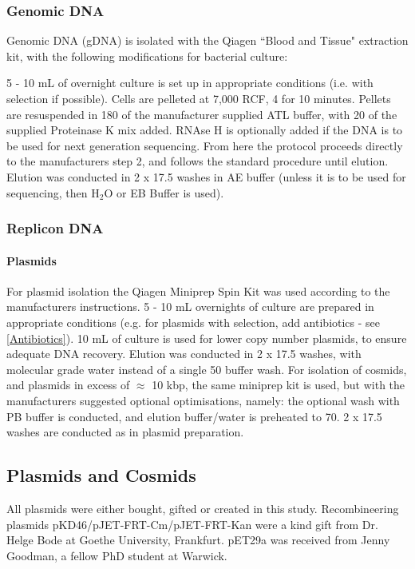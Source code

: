 	\subsubsection{Genomic DNA}\label{gdna}
		Genomic DNA (gDNA) is isolated with the Qiagen ``Blood and Tissue" extraction kit, with the following modifications for bacterial culture:

		 5 - 10 mL of overnight culture is set up in appropriate conditions (i.e. with selection if possible). Cells are pelleted at 7,000 RCF, 4\degC{} for 10 minutes. Pellets are resuspended in 180\ul{} of the manufacturer supplied ATL buffer, with 20\ul{} of the supplied Proteinase K mix added. RNAse H is optionally added if the DNA is to be used for next generation sequencing. From here the protocol proceeds directly to the manufacturers step 2, and follows the standard procedure until elution. Elution was conducted in 2 x 17.5\ul{} washes in AE buffer (unless it is to be used for sequencing, then H$_2$O or EB Buffer is used).

	\subsubsection{Replicon DNA}\label{Plasmids}
			\paragraph{Plasmids}
		For plasmid isolation the Qiagen Miniprep Spin Kit was used according to the manufacturers instructions. 5 - 10 mL overnights of culture are prepared in appropriate conditions (e.g. for plasmids with selection, add antibiotics - see \vref{Antibiotics}). 10 mL of culture is used for lower copy number plasmids, to ensure adequate DNA recovery. Elution was conducted in 2 x 17.5 \ul{} washes, with molecular grade water instead of a single 50 \ul{} buffer wash. For isolation of cosmids, and plasmids in excess of $\approx$ 10 kbp, the same miniprep kit is used, but with the manufacturers suggested optional optimisations, namely: the optional wash with PB buffer is conducted, and elution buffer/water is preheated to 70\degC. 2 x 17.5 \ul{} washes are conducted as in plasmid preparation.

\newpage
	\subsection{Plasmids and Cosmids}
	All plasmids were either bought, gifted or created in this study. Recombineering plasmids pKD46/pJET-FRT-Cm/pJET-FRT-Kan were a kind gift from Dr. Helge Bode at Goethe University, Frankfurt. pET29a was received from Jenny Goodman, a fellow PhD student at Warwick.
	
